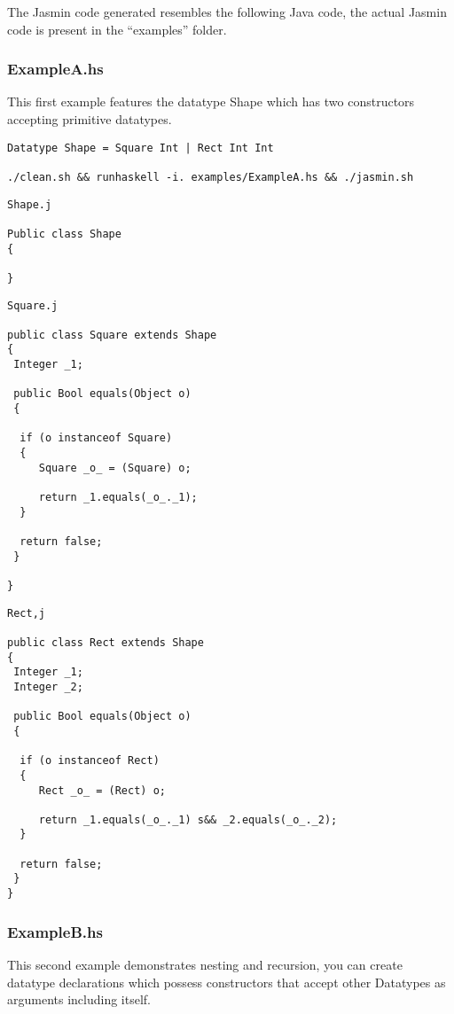 \documentclass{article}
\begin{document}
The Jasmin code generated resembles the following Java code, the actual Jasmin code is present in the ``examples'' folder.

\subsubsection{ExampleA.hs}

This first example features the datatype Shape which has two constructors accepting primitive datatypes. 

\begin{verbatim}
Datatype Shape = Square Int | Rect Int Int

./clean.sh && runhaskell -i. examples/ExampleA.hs && ./jasmin.sh
\end{verbatim}

\begin{verbatim}
Shape.j

Public class Shape
{

}
\end{verbatim}

\begin{verbatim}
Square.j

public class Square extends Shape
{
 Integer _1;

 public Bool equals(Object o)
 {

  if (o instanceof Square)
  {
     Square _o_ = (Square) o;
     
     return _1.equals(_o_._1);
  }
  
  return false;
 }
 
}
\end{verbatim}

\begin{verbatim}
Rect,j

public class Rect extends Shape
{
 Integer _1;
 Integer _2; 

 public Bool equals(Object o)
 {

  if (o instanceof Rect)
  {
     Rect _o_ = (Rect) o;
     
     return _1.equals(_o_._1) s&& _2.equals(_o_._2);
  }
  
  return false;
 }
}

\end{verbatim}

\subsubsection{ExampleB.hs}

This second example demonstrates nesting and recursion, you can create datatype declarations which possess constructors that accept other Datatypes as arguments including itself. 
\end{document}
